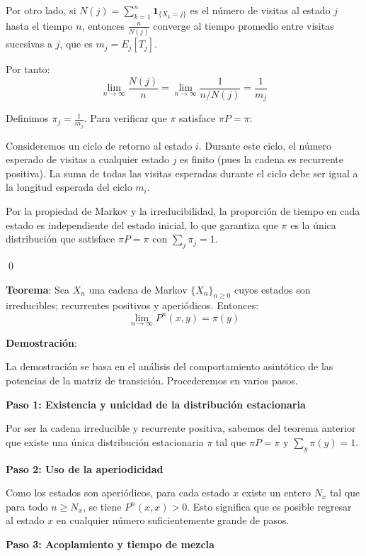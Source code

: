 \documentclass[12pt,a4paper]{article}
\newcommand{\teorema}[1]{%
\begin{teoremabox}
\textbf{Teorema}: #1
\end{teoremabox}
}
\begin{document}
Por otro lado, si $N(j) = \sum_{k=1}^{n} \mathbf{1}_{\{X_k = j\}}$ es el número de visitas al estado $j$ hasta el tiempo $n$, entonces $\frac{n}{N(j)}$ converge al tiempo promedio entre visitas sucesivas a $j$, que es $m_j = E_j[T_j]$.

Por tanto:
\begin{equation*}
\lim_{n \to \infty} \frac{N(j)}{n} = \lim_{n \to \infty} \frac{1}{n/N(j)} = \frac{1}{m_j}
\end{equation*}

Definimos $\pi_j = \frac{1}{m_j}$. Para verificar que $\pi$ satisface $\pi P = \pi$:

Consideremos un ciclo de retorno al estado $i$. Durante este ciclo, el número esperado de visitas a cualquier estado $j$ es finito (pues la cadena es recurrente positiva). La suma de todas las visitas esperadas durante el ciclo debe ser igual a la longitud esperada del ciclo $m_i$.

Por la propiedad de Markov y la irreducibilidad, la proporción de tiempo en cada estado es independiente del estado inicial, lo que garantiza que $\pi$ es la única distribución que satisface $\pi P = \pi$ con $\sum_{j} \pi_j = 1$.

\qed

\teorema{Sea $X_n$ una cadena de Markov $\{X_n\}_{n \geq 0}$ cuyos estados son irreducibles; recurrentes positivos y aperiódicos. Entonces:
\begin{equation*}
\lim_{n \to \infty} P^n(x,y) = \pi(y)
\end{equation*}}

\textbf{Demostración}:

La demostración se basa en el análisis del comportamiento asintótico de las potencias de la matriz de transición. Procederemos en varios pasos.

\textbf{Paso 1: Existencia y unicidad de la distribución estacionaria}

Por ser la cadena irreducible y recurrente positiva, sabemos del teorema anterior que existe una única distribución estacionaria $\pi$ tal que $\pi P = \pi$ y $\sum_{y} \pi(y) = 1$.

\textbf{Paso 2: Uso de la aperiodicidad}

Como los estados son aperiódicos, para cada estado $x$ existe un entero $N_x$ tal que para todo $n \geq N_x$, se tiene $P^n(x,x) > 0$. Esto significa que es posible regresar al estado $x$ en cualquier número suficientemente grande de pasos.

\textbf{Paso 3: Acoplamiento y tiempo de mezcla}
\end{document}
